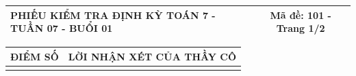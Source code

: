 \documentclass[12pt,a4paper]{article}
\begin{document}
\pagestyle{empty}

\noindent
\begin{tabularx}{\linewidth}{|X|c|}
\hline
\textbf{PHIẾU KIỂM TRA ĐỊNH KỲ TOÁN 7 - TUẦN 07 - BUỔI 01} & \textbf{Mã đề: 101 - Trang 1/2} \\
\hline
\end{tabularx}

\vspace{1.2mm}

\noindent
\begin{tabularx}{\linewidth}{|p{3.2cm}|X|}
\hline
\centering\textbf{ĐIỂM SỐ} & \centering\textbf{LỜI NHẬN XÉT CỦA THẦY CÔ} \tabularnewline
\hline
\rule{0pt}{1.8cm} & \tabularnewline
\hline
\end{tabularx}

\vspace{1.5mm}
\end{document}
